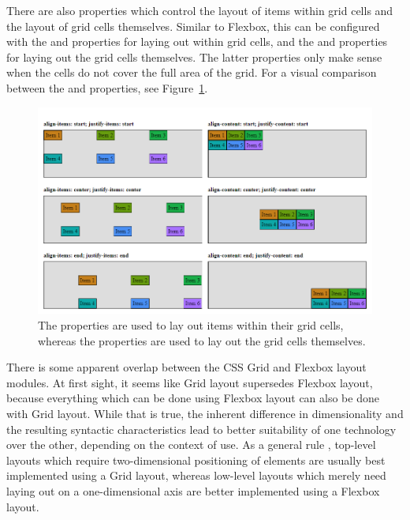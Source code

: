 There are also properties which control the layout of items within
grid cells and the layout of grid cells themselves. Similar to
Flexbox, this can be configured with the  and
 properties for laying out within grid cells,
and the  and 
properties for laying out the grid cells themselves. The latter
 properties only make sense when the cells do not
cover the full area of the grid. For a visual comparison between the
 and  properties, see
Figure~\ref{fig:GridLayoutProperties}.


\begin{figure}[tp]
\centering
\includegraphics[keepaspectratio,width=\linewidth,height=\halfh]
{images/grid-layout-properties.png}
\caption[Grid Layout Property Comparision]{
The  properties are used to lay out items within
their grid cells, whereas the  properties are
used to lay out the grid cells themselves. 
}
\label{fig:GridLayoutProperties}
\end{figure}


There is some apparent overlap between the CSS Grid and Flexbox layout
modules. At first sight, it seems like Grid layout supersedes Flexbox
layout, because everything which can be done using Flexbox layout can
also be done with Grid layout. While that is true, the inherent
difference in dimensionality and the resulting syntactic
characteristics lead to better suitability of one technology over the
other, depending on the context of use. As a general rule
\parencite{CSSGridVsFlexbox}, top-level layouts which require
two-dimensional positioning of elements are usually best implemented
using a Grid layout, whereas low-level layouts which merely need
laying out on a one-dimensional axis are better implemented using a
Flexbox layout.

